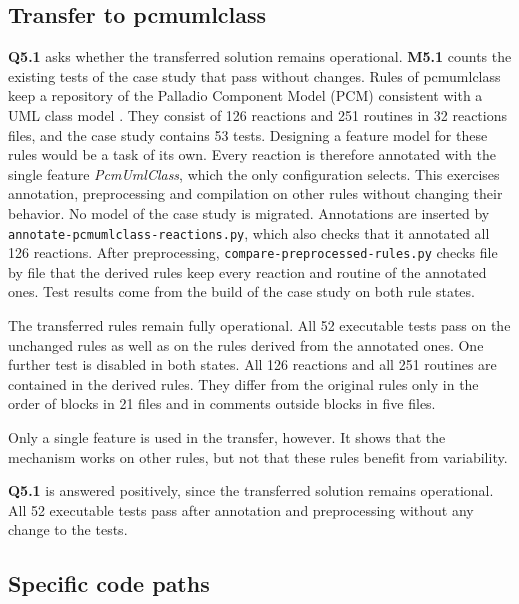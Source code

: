 \subsection{Transfer to pcmumlclass}
\label{sec:Evaluation:Generalizability:TransferToPcmumlclass}

\textbf{Q5.1} asks whether the transferred solution remains operational.
\textbf{M5.1} counts the existing tests of the case study that pass without changes.
Rules of pcmumlclass keep a repository of the Palladio Component Model (PCM) consistent with a UML class model \cite{umlpcmcasestudy}.
They consist of 126 reactions and 251 routines in 32 reactions files, and the case study contains 53 tests.
Designing a feature model for these rules would be a task of its own.
Every reaction is therefore annotated with the single feature \textit{PcmUmlClass}, which the only configuration selects.
This exercises annotation, preprocessing and compilation on other rules without changing their behavior.
No model of the case study is migrated.
Annotations are inserted by \texttt{annotate-pcmumlclass-reactions.py}, which also checks that it annotated all 126 reactions.
After preprocessing, \texttt{compare-preprocessed-rules.py} checks file by file that the derived rules keep every reaction and routine of the annotated ones.
Test results come from the build of the case study on both rule states.

The transferred rules remain fully operational.
All 52 executable tests pass on the unchanged rules as well as on the rules derived from the annotated ones.
One further test is disabled in both states.
All 126 reactions and all 251 routines are contained in the derived rules.
They differ from the original rules only in the order of blocks in 21 files and in comments outside blocks in five files.

Only a single feature is used in the transfer, however.
It shows that the mechanism works on other rules, but not that these rules benefit from variability.

\textbf{Q5.1} is answered positively, since the transferred solution remains operational.
All 52 executable tests pass after annotation and preprocessing without any change to the tests.

\subsection{Specific code paths}
\label{sec:Evaluation:Generalizability:SpecificCodePaths}

